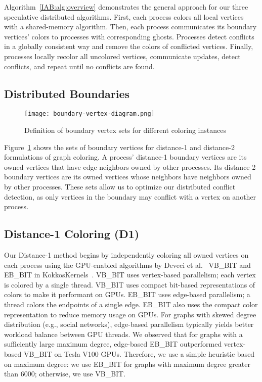 Algorithm~\ref{IAB:alg:overview} demonstrates the general approach for our three speculative distributed algorithms. 
First, each process colors all local vertices with a shared-memory algorithm.
Then, each process communicates its boundary vertices' colors to processes with corresponding ghosts.
Processes detect conflicts in a globally consistent way and remove the colors of conflicted vertices.
Finally, processes locally recolor all uncolored vertices, communicate updates, detect conflicts, and repeat until no conflicts are found.

\subsection{Distributed Boundaries}

\begin{figure}
  \texttt{[image: boundary-vertex-diagram.png]}
  \caption{Definition of boundary vertex sets for different coloring instances}
  \label{IAB:boundary-verts}
\end{figure}

Figure~\ref{IAB:boundary-verts} shows the sets of boundary vertices for distance-1 and distance-2 formulations of graph coloring.
A process' distance-1 boundary vertices are its owned vertices that have edge neighbors owned by other processes.
Its distance-2 boundary vertices are its owned vertices whose neighbors have neighbors owned by other processes.
These sets allow us to optimize our distributed conflict detection, as only vertices in the boundary may conflict with a vertex on another process.


\subsection{Distance-1 Coloring (D1)}

Our Distance-1 method begins by independently coloring all owned vertices on each process using the GPU-enabled algorithms by Deveci et al.~\cite{IAB:deveci2016parallel}
VB\_BIT and EB\_BIT in KokkosKernels~\cite{kokkoskernels}.
VB\_BIT uses vertex-based parallelism; each vertex is colored by a single thread. VB\_BIT uses compact bit-based representations of colors to make it performant on GPUs.
EB\_BIT uses edge-based parallelism; a thread colors the endpoints of a single edge. EB\_BIT also uses the compact color representation to reduce memory usage on GPUs.
For graphs with skewed degree distribution (e.g., social networks), edge-based parallelism typically yields better workload balance between GPU threads.
We observed that for graphs with a sufficiently large maximum degree, edge-based EB\_BIT outperformed vertex-based VB\_BIT on Tesla V100 GPUs.
Therefore, we use a simple heuristic based on maximum degree:  we use EB\_BIT for graphs with maximum degree greater than 6000; otherwise, we use VB\_BIT.

